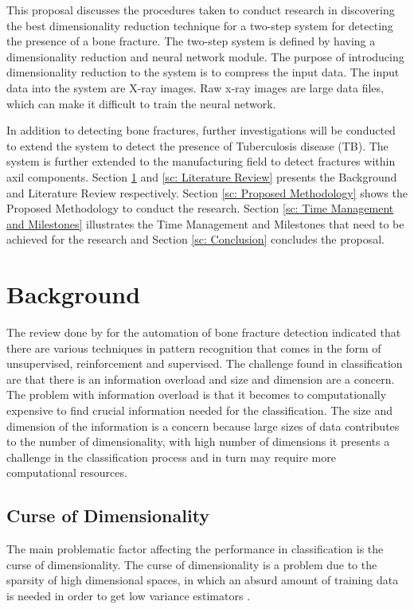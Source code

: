 \documentclass[11pt,twocolumn]{witseiepaper}
\begin{document}
	This proposal discusses the procedures taken to conduct research in discovering the best dimensionality reduction technique for a two-step system for detecting the presence of a bone fracture. The two-step system is defined by having a dimensionality reduction and neural network module. The purpose of introducing dimensionality reduction to the system is to compress the input data. The input data into the system are X-ray images. Raw x-ray images are large data files, which can make it difficult to train the neural network.
	
	In addition to detecting bone fractures, further investigations will be conducted to extend the system to detect the presence of Tuberculosis disease (TB). The system is further extended to the manufacturing field to detect fractures within axil components. Section \ref{sc: Background} and \ref{sc: Literature Review} presents the Background and Literature Review respectively. Section \ref{sc: Proposed Methodology} shows the Proposed Methodology to conduct the research. Section \ref{sc: Time Management and Milestones} illustrates the Time Management and Milestones that need to be achieved for the research and Section \ref{sc: Conclusion} concludes the proposal.  
	
	\section{Background}
	\label{sc: Background}
	The review done by \cite{Mahendran2011} for the automation of bone fracture detection indicated that there are various techniques in pattern recognition that comes in the form of unsupervised, reinforcement and supervised. The challenge found in classification are that there is an information overload and size and dimension are a concern. The problem with information overload is that it becomes to computationally expensive to find crucial information needed for the classification. The size and dimension of the information is a concern because large sizes of data contributes to the number of dimensionality, with high number of dimensions it presents a challenge in the classification process and in turn may require more computational resources.
	
	\subsection{Curse of Dimensionality}
	The main problematic factor affecting the performance in classification is the curse of dimensionality. The curse of dimensionality is a problem due to the sparsity of high dimensional spaces, in which an absurd amount of training data is needed in order to get low variance  estimators \cite{intrator_feature_1992}.
	
\end{document}
